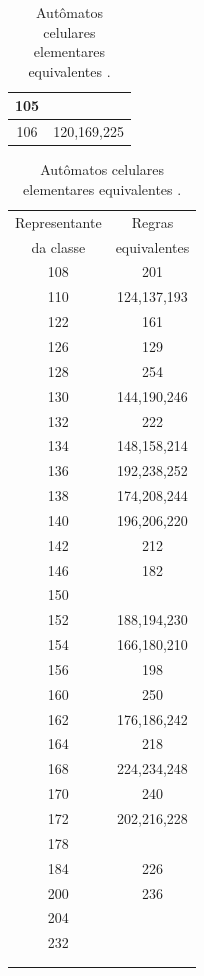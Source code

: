 \documentclass[12pt,a4paper]{article}
\begin{document}
\begin{table}[H]
\begin{minipage}[b]{0.3\linewidth}
\begin{tabular}{|c|c|}
105 & \\ \hline
106 & 120,169,225 \\ \hline
\end{tabular}
\end{minipage}
\hspace{0.3cm}
\begin{minipage}[b]{0.3\linewidth}
\centering
\begin{tabular}{|c|c|}
\hline
\footnotesize Representante & \footnotesize Regras \\
{\footnotesize da classe} & \footnotesize equivalentes \\ \hline
108 & 201 \\ \hline
110 & 124,137,193 \\ \hline
122 & 161 \\ \hline
126 & 129 \\ \hline
128 & 254 \\ \hline
130 & 144,190,246 \\ \hline
132 & 222 \\ \hline
134 & 148,158,214 \\ \hline
136 & 192,238,252 \\ \hline
138 & 174,208,244 \\ \hline
140 & 196,206,220 \\ \hline
142 & 212 \\ \hline
146 & 182 \\ \hline
150 & \\ \hline
152 & 188,194,230 \\ \hline
154 & 166,180,210 \\ \hline
156 & 198 \\ \hline
160 & 250 \\ \hline
162 & 176,186,242 \\ \hline
164 & 218 \\ \hline
168 & 224,234,248 \\ \hline
170 & 240 \\ \hline
172 & 202,216,228 \\ \hline
178 & \\ \hline
184 & 226 \\ \hline
200 & 236 \\ \hline
204 & \\ \hline
232 & \\ \hline
& \\ \hline
& \\ \hline
\end{tabular}
\end{minipage}
\caption{Autômatos celulares elementares equivalentes .}
\label{tab:equiv}
\end{table}
\end{document}
